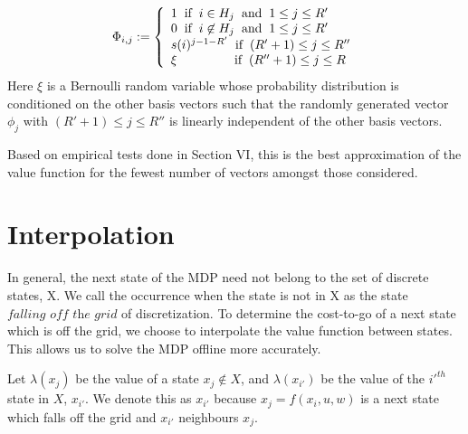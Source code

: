 \documentclass[conference]{IEEEtran}
\begin{document}
    \begin{displaymath}
        \Phi_{i,j}:=\left\{
            \begin{array}{l}
            1 \hspace{0.2cm} \text{if} \hspace{0.2cm} i\in H_{j} \hspace{0.2cm} \text{and} \hspace{0.2cm} 1\leq j\leq R'\\
            0 \hspace{0.2cm} \text{if} \hspace{0.2cm} i\not\in H_{j} \hspace{0.2cm} \text{and} \hspace{0.2cm} 1\leq j\leq R'\\
            s(i)^{j-1-R'} \hspace{0.2cm} \text{if} \hspace{0.2cm} (R'+1)\leq j\leq R''\\
            \xi \hspace{1.6cm} \text{if} \hspace{0.2cm} (R''+1)\leq j\leq R
            \end{array}
            \right.
    \end{displaymath} Here $\xi$ is a Bernoulli random variable whose probability distribution is conditioned on the other basis vectors such that the randomly generated vector $\phi_{j}$ with $(R'+1)\leq j\leq R''$ is linearly independent of the other basis vectors.
    
    Based on empirical tests done in Section VI, this is the best approximation of the value function for the fewest number of vectors amongst those considered.







\section{Interpolation}
In general, the next state of the MDP need not belong to the set of discrete states, X. We call the occurrence when the state is not in X as the state $\textit{falling off the grid}$ of discretization. To determine the cost-to-go of a next state which is off the grid, we choose to interpolate the value function between states. This allows us to solve the MDP offline more accurately.

Let $\lambda(x_{j})$ be the value of a state $x_{j} \not\in X$, and $\lambda(x_{i'})$ be the value of the $i'^{th}$ state in $X$, $x_{i'}$. We denote this as $x_{i'}$ because $x_{j}=f(x_{i}, u, w)$ is a next state which falls off the grid and $x_{i'}$ neighbours $x_{j}$. 
\end{document}
